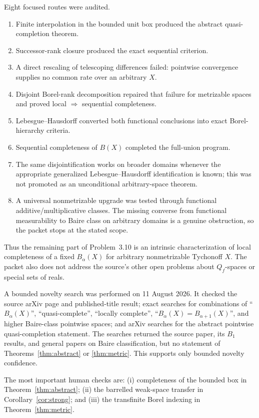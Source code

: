 \documentclass[11pt]{article}
\begin{document}
Eight focused routes were audited.
\begin{enumerate}
\item Finite interpolation in the bounded unit box produced the abstract
      quasi-completion theorem.
\item Successor-rank closure produced the exact sequential criterion.
\item A direct rescaling of telescoping differences failed: pointwise
      convergence supplies no common rate over an arbitrary $X$.
\item Disjoint Borel-rank decomposition repaired that failure for metrizable
      spaces and proved local $\Rightarrow$ sequential completeness.
\item Lebesgue--Hausdorff converted both functional conclusions into exact
      Borel-hierarchy criteria.
\item Sequential completeness of $B(X)$ completed the full-union program.
\item The same disjointification works on broader domains whenever the
      appropriate generalized Lebesgue--Hausdorff identification is known;
      this was not promoted as an unconditional arbitrary-space theorem.
\item A universal nonmetrizable upgrade was tested through functional
      additive/multiplicative classes.  The missing converse from functional
      measurability to Baire class on arbitrary domains is a genuine
      obstruction, so the packet stops at the stated scope.
\end{enumerate}

Thus the remaining part of Problem~3.10 is an intrinsic characterization of
local completeness of a fixed $B_\alpha(X)$ for arbitrary nonmetrizable
Tychonoff $X$.  The packet also does not address the source's other open
problems about $Q_f$-spaces or special sets of reals.

A bounded novelty search was performed on 11 August 2026.  It checked the
source arXiv page and published-title result; exact searches for combinations
of ``$B_\alpha(X)$'', ``quasi-complete'', ``locally complete'',
``$B_\alpha(X)=B_{\alpha+1}(X)$'', and higher Baire-class pointwise spaces;
and arXiv searches for the abstract pointwise quasi-completion statement.
The searches returned the source paper, its $B_1$ results, and general papers
on Baire classification, but no statement of Theorems~\ref{thm:abstract} or
\ref{thm:metric}.  This supports only bounded novelty confidence.

The most important human checks are: (i) completeness of the bounded box in
Theorem~\ref{thm:abstract}; (ii) the barrelled weak-space transfer in
Corollary~\ref{cor:strong}; and (iii) the transfinite Borel indexing in
Theorem~\ref{thm:metric}.
\end{document}
